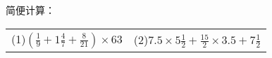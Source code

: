 
简便计算：\\
\begin{tabular}{ll}
	(1)$\left(\frac{1}{9}+1 \frac{4}{7}+\frac{8}{21}\right) \times 63$ \hspace{16em}  & 
	(2)$7.5 \times 5 \frac{1}{2}+\frac{15}{2} \times 3.5+7 \frac{1}{2}$ \hspace{16em} \\
\end{tabular}
